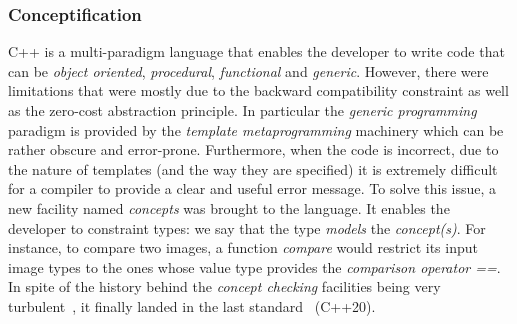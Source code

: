 \subsubsection{Conceptification}
\label{subsec:conceptification}

C++ is a multi-paradigm language that enables the developer to write code that can be \emph{object oriented},
\emph{procedural}, \emph{functional} and \emph{generic}. However, there were limitations that were mostly due to the
backward compatibility constraint as well as the zero-cost abstraction principle. In particular the \emph{generic
  programming} paradigm is provided by the \emph{template metaprogramming} machinery which can be rather obscure and
error-prone. Furthermore, when the code is incorrect, due to the nature of templates (and the way they are specified) it
is extremely difficult for a compiler to provide a clear and useful error message. To solve this issue, a new facility
named \emph{concepts} was brought to the language. It enables the developer to constraint types: we say that the type
\emph{models} the \emph{concept(s)}. For instance, to compare two images, a function \emph{compare} would restrict its
input image types to the ones whose value type provides the \emph{comparison operator ==}. In spite of the history
behind the \emph{concept checking} facilities being very
turbulent~\parencite{seymour.2009.concepts,stroustrup.2003.concepts,sutton.2017.concepts}, it finally landed in the last
standard~\parencite{voutilainen.2017.concepts} (C++20).

